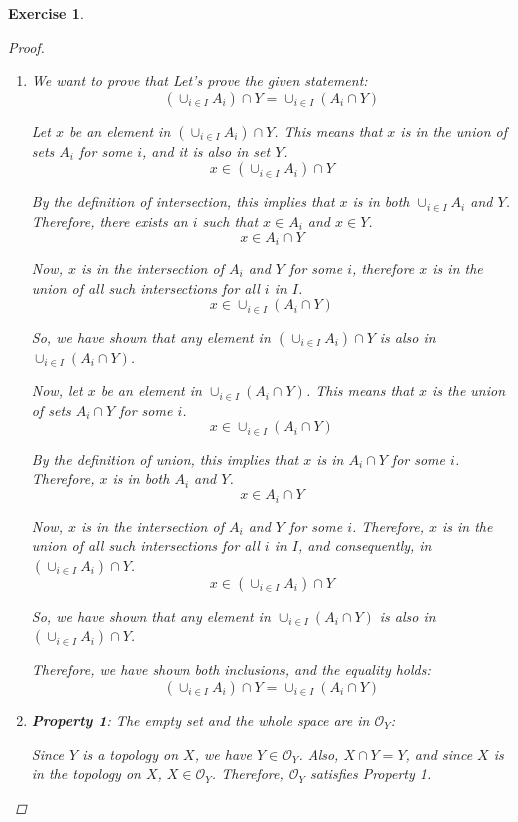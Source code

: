 \documentclass{article}
\newtheorem{exercise}{Exercise}
\begin{document}
\begin{exercise}
\begin{proof}
\begin{enumerate}
        \item We want to prove that
Let's prove the given statement:
\[ (\cup_{i\in I} A_i) \cap Y = \cup_{i\in I} (A_i \cap Y) \]

Let \( x \) be an element in \( (\cup_{i\in I} A_i) \cap Y \). This means that \( x \) is in the union of sets \( A_i \) for some \( i \), and it is also in set \( Y \).
\[ x \in (\cup_{i\in I} A_i) \cap Y \]

By the definition of intersection, this implies that \( x \) is in both \( \cup_{i\in I} A_i \) and \( Y \). Therefore, there exists an \( i \) such that \( x \in A_i \) and \( x \in Y \).
\[ x \in A_i \cap Y \]

Now, \( x \) is in the intersection of \( A_i \) and \( Y \) for some \( i \), therefore \( x \) is in the union of all such intersections for all \( i \) in \( I \).
\[ x \in \cup_{i\in I} (A_i \cap Y) \]

So, we have shown that any element in \( (\cup_{i\in I} A_i) \cap Y \) is also in \( \cup_{i\in I} (A_i \cap Y) \).

Now, let \( x \) be an element in \( \cup_{i\in I} (A_i \cap Y) \). This means that \( x \) is the union of sets \( A_i \cap Y \) for some \( i \).
\[ x \in \cup_{i\in I} (A_i \cap Y) \]

By the definition of union, this implies that \( x \) is in \( A_i \cap Y \) for some \( i \). Therefore, \( x \) is in both \( A_i \) and \( Y \).
\[ x \in A_i \cap Y \]

Now, \( x \) is in the intersection of \( A_i \) and \( Y \) for some \( i \). Therefore, \( x \) is in the union of all such intersections for all \( i \) in \( I \), and consequently, in \( (\cup_{i\in I} A_i) \cap Y \).
\[ x \in (\cup_{i\in I} A_i) \cap Y \]

So, we have shown that any element in \( \cup_{i\in I} (A_i \cap Y) \) is also in \( (\cup_{i\in I} A_i) \cap Y \).

Therefore, we have shown both inclusions, and the equality holds:
\[ (\cup_{i\in I} A_i) \cap Y = \cup_{i\in I} (A_i \cap Y) \]



    \item \textbf{Property 1}: The empty set and the whole space are in $\mathcal{O}_Y$:

Since $Y$ is a topology on $X$, we have $Y \in \mathcal{O}_Y$. Also, $X \cap Y = Y$, and since $X$ is in the topology on $X$, $X \in \mathcal{O}_Y$. Therefore, $\mathcal{O}_Y$ satisfies Property 1.


\end{enumerate}
\end{proof}
\end{exercise}
\end{document}
